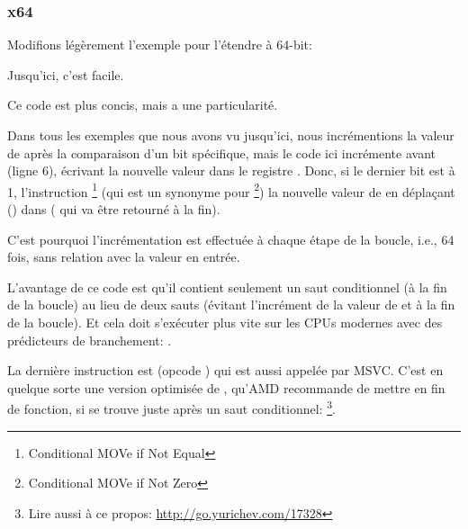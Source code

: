 \subsubsection{x64}
\label{subsec:popcnt}

Modifions légèrement l'exemple pour l'étendre à 64-bit:




Jusqu'ici, c'est facile.






Ce code est plus concis, mais a une particularité.

Dans tous les exemples que nous avons vu jusqu'ici, nous incrémentions la valeur
de  après la comparaison d'un bit spécifique, mais le code ici incrémente 
avant (ligne 6), écrivant la nouvelle valeur dans le registre \EDX.
Donc, si le dernier bit est à 1, l'instruction \CMOVNE\footnote{Conditional MOVe if Not Equal}
(qui est un synonyme pour \CMOVNZ\footnote{Conditional MOVe if Not Zero}) 
la nouvelle valeur de  en déplaçant  \EDX () dans
\EAX ( qui va être retourné à la fin).

C'est pourquoi l'incrémentation est effectuée à chaque étape de la boucle, i.e.,
64 fois, sans relation avec la valeur en entrée.

L'avantage de ce code est qu'il contient seulement un saut conditionnel (à la fin
de la boucle) au lieu de deux sauts (évitant l'incrément de la valeur de  et
à la fin de la boucle).
Et cela doit s'exécuter plus vite sur les CPUs modernes avec des prédicteurs de branchement:
.

\label{FATRET}
La dernière instruction est  (opcode ) qui est aussi appelée
 par MSVC.
C'est en quelque sorte une version optimisée de \RET, qu'AMD recommande de mettre
en fin de fonction, si \RET se trouve juste après un saut conditionnel:
\footnote{Lire aussi à ce propos: \url{http://go.yurichev.com/17328}}.

